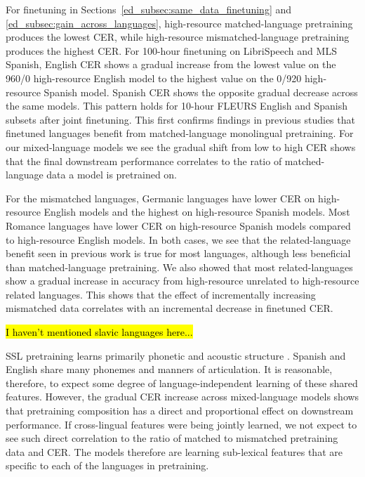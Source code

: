 For finetuning in Sections~\ref{ed_subsec:same_data_finetuning} and \ref{ed_subsec:gain_across_languages}, high-resource matched-language pretraining produces the lowest CER, while high-resource mismatched-language pretraining produces the highest CER. For 100-hour finetuning on LibriSpeech and MLS Spanish, English CER shows a gradual increase from the lowest value on the 960/0 high-resource English model to the highest value on the 0/920 high-resource Spanish model. Spanish CER shows the opposite gradual decrease across the same models. This pattern holds for 10-hour FLEURS English and Spanish subsets after joint finetuning. This first confirms findings in previous studies that finetuned languages benefit from matched-language monolingual pretraining. For our mixed-language models we see the gradual shift from low to high CER shows that the final downstream performance correlates to the ratio of matched-language data a model is pretrained on.

For the mismatched languages, Germanic languages have lower CER on high-resource English models and the highest on high-resource Spanish models. Most Romance languages have lower CER on high-resource Spanish models compared to high-resource English models. In both cases, we see that the related-language benefit seen in previous work \cite{...} is true for most languages, although less beneficial than matched-language pretraining. We also showed that most related-languages show a gradual increase in accuracy from high-resource unrelated to high-resource related languages. This shows that the effect of incrementally increasing mismatched data correlates with an incremental decrease in finetuned CER.

\hl{I haven't mentioned slavic languages here...}

SSL pretraining learns primarily phonetic and acoustic structure \cite{pasad2021layer}. Spanish and English share many phonemes and manners of articulation. It is reasonable, therefore, to expect some degree of language-independent learning of these shared features. However, the gradual CER increase across mixed-language models shows that pretraining composition has a direct and proportional effect on downstream performance. If cross-lingual features were being jointly learned, we not expect to see such direct correlation to the ratio of matched to mismatched pretraining data and CER. The models therefore are learning sub-lexical features that are specific to each of the languages in pretraining. 

